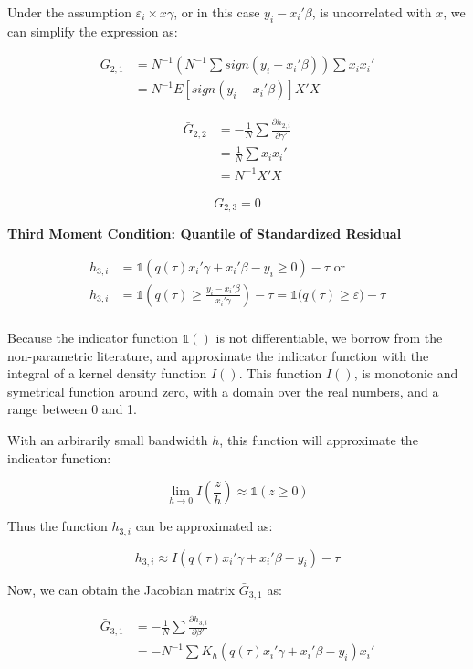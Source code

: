 \documentclass[
  authoryear,
  review,
  1p]{elsarticle}
\begin{document}
Under the assumption \(\varepsilon_i \times x\gamma\), or in this case
\(y_i-x_i'\beta\), is uncorrelated with \(x\), we can simplify the
expression as:

\[\begin{aligned}
\bar G_{2,1} &= N^{-1} \left(N^{-1}\sum sign(y_i-x_i'\beta)\right) \sum x_i x_i' \\
&= N^{-1} E[sign(y_i-x_i'\beta)] X'X
\end{aligned}
\]

\[\begin{aligned}
\bar G_{2,2} &= -\frac{1}{N} \sum \frac{\partial h_{2,i}}{\partial \gamma'} \\
             &=  \frac{1}{N} \sum x_i x_i' \\
             &= N^{-1} X'X
\end{aligned}
\]

\[\bar G_{2,3}=0\]

\textbf{Third Moment Condition: Quantile of Standardized Residual}

\[\begin{aligned}
h_{3,i} &= \mathbb{1}\left(q(\tau) x_i'\gamma +x_i'\beta - y_i \geq 0 \right) - \tau \text{ or}\\
h_{3,i} &= \mathbb{1}\left( q(\tau)  \geq \frac{y_i- x_i'\beta}{x_i'\gamma}  \right) - \tau = \mathbb{1}\big( q(\tau)  \geq \varepsilon  \big) - \tau \\
\end{aligned}
\]

Because the indicator function \(\mathbb{1}()\) is not differentiable,
we borrow from the non-parametric literature, and approximate the
indicator function with the integral of a kernel density function
\(I()\). This function \(I()\), is monotonic and symetrical function
around zero, with a domain over the real numbers, and a range between 0
and 1.

With an arbirarily small bandwidth \(h\), this function will approximate
the indicator function:

\[
\lim_{h\rightarrow 0} I\left(\frac{z}{h}\right) \approx \mathbb{1}(z\geq 0)
\]

Thus the function \(h_{3,i}\) can be approximated as:

\[h_{3,i} \approx I\left( q(\tau) x_i'\gamma +x_i'\beta - y_i  \right) - \tau\]

Now, we can obtain the Jacobian matrix \(\bar G_{3,1}\) as:

\[\begin{aligned}
\bar G_{3,1} &= -\frac{1}{N} \sum \frac{\partial h_{3,i}}{\partial \beta'} \\
             &= -N^{-1} \sum K_h(q(\tau) x_i'\gamma +x_i'\beta - y_i ) x_i'
\end{aligned}
\]
\end{document}

